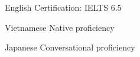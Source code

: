 
\begin{cvskills}

  \cvskill
    {English} %
    {Certification: IELTS 6.5} %

  \cvskill
    {Vietnamese} %
    {Native proficiency} %

  \cvskill
    {Japanese} %
    {Conversational proficiency} %


\end{cvskills}
